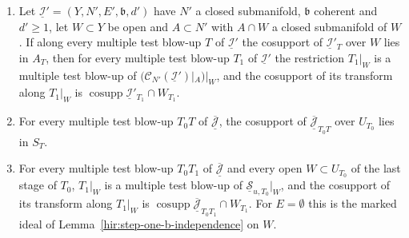 \begin{theorem}
\label{mc:contact-stage-tail}
\leanok
\begin{enumerate}
\item Let \(\underline{\mathcal I}'=(Y,N',E',\mathfrak b,d')\) have \(N'\) a closed submanifold, \(\mathfrak b\) coherent and \(d'\ge1\), let \(W\subset Y\) be open and \(A\subset N'\)
with \(A\cap W\) a closed submanifold of \(W\). If along every multiple test blow-up \(T\) of \(\underline{\mathcal I}'\) the cosupport of \(\underline{\mathcal I}'_T\) over \(W\) lies in
\(A_T\), then for every multiple test blow-up \(T_1\) of \(\underline{\mathcal I}'\) the restriction \(T_1|_W\) is a multiple test blow-up of
\((\mathcal C_{N'}(\underline{\mathcal I}')|_A)|_W\), and the cosupport of its transform along \(T_1|_W\) is \(\operatorname{cosupp}\underline{\mathcal I}'_{T_1}\cap W_{T_1}\).
\item For every multiple test blow-up \(T_0T\) of \(\overline{\underline{\mathcal J}}\), the cosupport of \(\overline{\underline{\mathcal J}}_{T_0T}\) over \(U_{T_0}\) lies in \(S_T\).
\item For every multiple test blow-up \(T_0T_1\) of \(\overline{\underline{\mathcal J}}\) and every open \(W\subset U_{T_0}\) of the last stage of \(T_0\), \(T_1|_W\) is a multiple
test blow-up of \(\underline{\mathcal S}_{u,T_0}|_W\), and the cosupport of its transform along \(T_1|_W\) is \(\operatorname{cosupp}\overline{\underline{\mathcal J}}_{T_0T_1}\cap W_{T_1}\).
For \(E=\emptyset\) this is the marked ideal of Lemma~\ref{hir:step-one-b-independence} on \(W\).
\end{enumerate}
\end{theorem}
